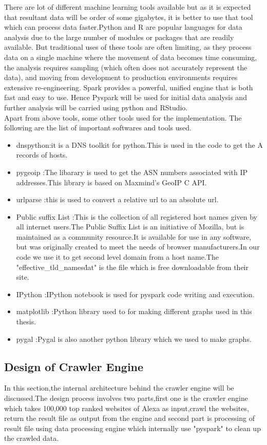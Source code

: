 \noindent There are lot of different machine learning tools available but as it is expected that resultant data will be order of some gigabytes, it is better to use that tool which can process data faster.Python and R are popular languages for data analysis due to the large number of modules or packages that are readily available. But traditional uses of these tools are often limiting, as they process data on a single machine where the movement of data becomes time consuming, the analysis requires sampling (which often does not accurately represent the data), and moving from development to production environments requires extensive re-engineering. Spark provides a powerful, unified engine that is both fast and easy to use. Hence Pyspark will be used for initial data analysis and further analysis will be carried using python and RStudio.\\

\noindent Apart from above tools, some other tools used for the implementation. The following are the list of important softwares and tools used.

\begin{itemize}
  \item dnspython:it is a DNS toolkit for python.This is used in the code to get the A records of hosts.
  \item pygeoip :The libarary is used to get the ASN numbers associated with IP addresses.This library is based on Maxmind’s GeoIP C API.
  \item urlparse :this is used to convert a relative url to an absolute url.
  \item Public suffix List :This is the collection of all registered host names given by all internet users.The Public Suffix List is an initiative of Mozilla, but is maintained as a community resource.It is available for use in any software, but was originally created to meet the needs of browser manufacturers.In our code we use it to get second level domain from a host name.The "effective\_tld\_names\. dat" is the file which is free downloadable from their site.
  \item IPython :IPython notebook is used for pyspark code writing and execution.
  \item matplotlib :Python library used to for making different graphs used in this thesis.
  \item pygal :Pygal is also another python library which we used to make graphs.
\end{itemize}

\subsection{Design of Crawler Engine}
\noindent In this section,the internal architecture behind the crawler engine will be discussed.The design process involves two parts,first one is the crawler engine which takes 100,000 top ranked websites of Alexa as input,crawl the websites, return the result file as output from the engine and second part is processing of result file using data processing engine which internally use "pyspark" to clean up the crawled data.\\

